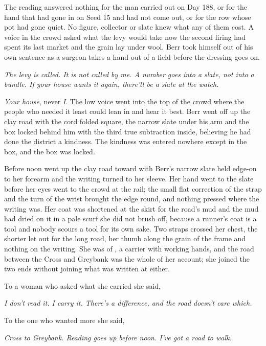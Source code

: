 The reading answered nothing for the man carried out on Day 188, or for the hand that had gone in on Seed 15 and had not come out, or for the row whose pot had gone quiet. No figure, collector or slate knew what any of them cost. A voice in the crowd asked what the levy would take now the second firing had spent its last market and the grain lay under wool. Berr took himself out of his own sentence as a surgeon takes a hand out of a field before the dressing goes on.

\emph{The levy is called. It is not called by me. A number goes into a slate, not into a bundle. If your house wants it again, there'll be a slate at the watch.}

\emph{Your house}, never \emph{I}. The low voice went into the top of the crowd where the people who needed it least could lean in and hear it best. Berr went off up the clay road with the cord folded square, the narrow slate under his arm and the box locked behind him with the third true subtraction inside, believing he had done the district a kindness. The kindness was entered nowhere except in the box, and the box was locked.

\scenebreak

Before noon  went up the clay road toward  with Berr's narrow slate held edge-on to her forearm and the writing turned to her sleeve. Her hand went to the slate before her eyes went to the crowd at the rail; the small flat correction of the strap and the turn of the wrist brought the edge round, and nothing pressed where the writing was. Her coat was shortened at the skirt for the road's mud and the mud had dried on it in a pale scurf she did not brush off, because a runner's coat is a tool and nobody scours a tool for its own sake. Two straps crossed her chest, the shorter let out for the long road, her thumb along the grain of the frame and nothing on the writing. She was of , a carrier with working hands, and the road between the Cross and Greybank was the whole of her account; she joined the two ends without joining what was written at either.

To a woman who asked what she carried she said,

\emph{I don't read it. I carry it. There's a difference, and the road doesn't care which.}

To the one who wanted more she said,

\emph{Cross to Greybank. Reading goes up before noon. I've got a road to walk.}

